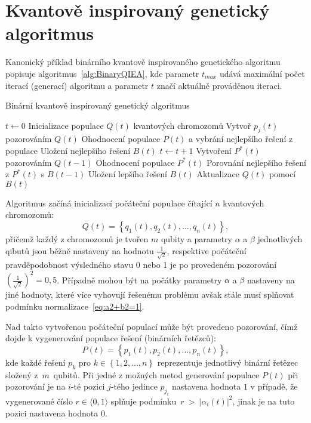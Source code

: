 \section{Kvantově inspirovaný genetický algoritmus}
Kanonický příklad binárního kvantově inspirovaného genetického algoritmu popisuje algoritmus~\ref{alg:BinaryQIEA}, kde parametr $t_{max}$ udává maximální počet iterací (generací) algoritmu a parametr $t$ značí aktuálně prováděnou iteraci. 
\begin{algorithm}[ht!]
    \caption{Binární kvantově inspirovaný genetický algoritmus~\cite{NaturalComputing}}
    \label{alg:BinaryQIEA}
    \begin{algorithmic}[1]
        \State $t \gets 0$
        \State Inicializace populace $Q(t)$ kvantových chromozomů
            \State Vytvoř $p_j(t)$ pozorováním $Q(t)$
        \EndFor
        \State Ohodnocení populace $P(t)$ a vybrání nejlepšího řešení z populace
        \State Uložení nejlepšího řešení $B(t)$
            \State $t \gets t + 1$
            \State Vytvoření $P^*(t)$ pozorováním $Q(t-1)$
            \State Ohodnocení populace $P^*(t)$
            \State Porovnání nejlepšího řešení z $P^*(t)$ s $B(t-1)$
            \State Uložení lepšího řešení $B(t)$
            \State Aktualizace $Q(t)$ pomocí $B(t)$
        \EndWhile
    \end{algorithmic}
\end{algorithm}
Algoritmus začíná inicializací počáteční populace čítající $n$ kvantových chromozomů:
\begin{equation*}
    Q(t) = \left\{ q_1(t), q_2(t), \dots, q_n(t) \right\},
\end{equation*}
přičemž každý z chromozomů je tvořen $m$ qubity a parametry $\alpha$ a $\beta$ jednotlivých qibutů jsou běžně nastaveny na hodnotu $\frac{1}{\sqrt{2}}$, respektive počáteční pravděpodobnost výsledného stavu 0 nebo 1 je po provedeném pozorování $\left(\frac{1}{\sqrt{2}}\right)^2 = 0,5$. 
Případně mohou být na počátky parametry $\alpha$ a $\beta$ nastaveny na jiné hodnoty, které více vyhovují řešenému problému avšak stále musí splňovat podmínku normalizace~\ref{eq:a2+b2=1}. 

Nad takto vytvořenou počáteční populací může být provedeno pozorování, čímž dojde k vygenerování populace řešení (binárních řetězců):
\begin{equation*}
    P(t) = \left\{ p_1(t), p_2(t), \dots, p_n(t) \right\},
\end{equation*}
kde každé řešení $p_k$ pro $k \in \left\{ 1, 2, \dots, n \right\}$ reprezentuje jednotlivý binární řetězec složený z~$m$~qubitů. 
Při jedné z možných metod generování populace $P(t)$ při pozorování je na $i$-té pozici $j$-tého jedince $p_{j_{i}}$ nastavena hodnota $1$ v případě, že vygenerované číslo $r \in \langle 0, 1\rangle$ splňuje podmínku~$r~>~\left| \alpha_i(t) \right|^2$, jinak je na tuto pozici nastavena hodnota $0$.

